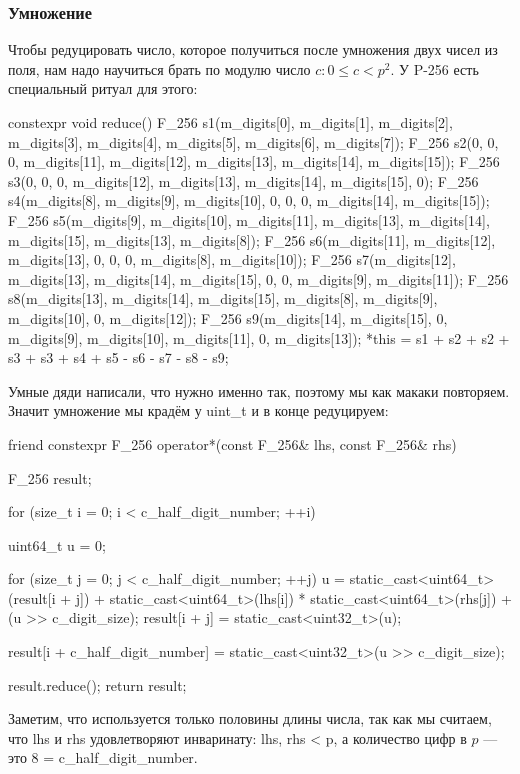\subsubsection{Умножение}
Чтобы редуцировать число, которое получиться после умножения двух чисел из поля, нам надо научиться брать по модулю число $c\colon 0\leqslant c < p^2$. У P-256 есть специальный ритуал для этого:
\begin{cppcode}
constexpr void reduce() {
    F_256 s1({m_digits[0],
              m_digits[1],
              m_digits[2],
              m_digits[3],
              m_digits[4],
              m_digits[5],
              m_digits[6],
              m_digits[7]});
    F_256 s2({0, 0, 0, m_digits[11], m_digits[12], m_digits[13], m_digits[14], m_digits[15]});
    F_256 s3({0, 0, 0, m_digits[12], m_digits[13], m_digits[14], m_digits[15], 0});
    F_256 s4({m_digits[8], m_digits[9], m_digits[10], 0, 0, 0, m_digits[14], m_digits[15]});
    F_256 s5({m_digits[9],
              m_digits[10],
              m_digits[11],
              m_digits[13],
              m_digits[14],
              m_digits[15],
              m_digits[13],
              m_digits[8]});
    F_256 s6({m_digits[11], m_digits[12], m_digits[13], 0, 0, 0, m_digits[8], m_digits[10]});
    F_256 s7({m_digits[12], m_digits[13], m_digits[14], m_digits[15], 0, 0, m_digits[9], m_digits[11]});
    F_256 s8({m_digits[13],
              m_digits[14],
              m_digits[15],
              m_digits[8],
              m_digits[9],
              m_digits[10],
              0,
              m_digits[12]});
    F_256 s9({m_digits[14], m_digits[15], 0, m_digits[9], m_digits[10], m_digits[11], 0, m_digits[13]});
    *this = s1 + s2 + s2 + s3 + s3 + s4 + s5 - s6 - s7 - s8 - s9;
}
\end{cppcode}
Умные дяди написали, что нужно именно так, поэтому мы как макаки повторяем. Значит умножение мы крадём у uint\_t и в конце редуцируем:
\begin{cppcode}
friend constexpr F_256 operator*(const F_256& lhs, const F_256& rhs) {
    F_256 result;

    for (size_t i = 0; i < c_half_digit_number; ++i) {
        uint64_t u = 0;

        for (size_t j = 0; j < c_half_digit_number; ++j) {
            u = static_cast<uint64_t>(result[i + j])
              + static_cast<uint64_t>(lhs[i]) * static_cast<uint64_t>(rhs[j]) + (u >> c_digit_size);
            result[i + j] = static_cast<uint32_t>(u);
        }

        result[i + c_half_digit_number] = static_cast<uint32_t>(u >> c_digit_size);
    }

    result.reduce();
    return result;
}
\end{cppcode}
Заметим, что используется только половины длины числа, так как мы считаем, что lhs и rhs удовлетворяют инваринату: lhs, rhs < p, а количество цифр в $p$ --- это 8 = c\_half\_digit\_number.
